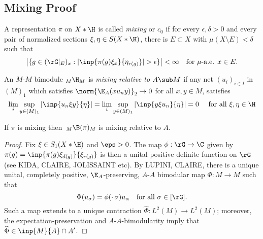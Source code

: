 \documentclass[../main.tex]{subfiles}
\begin{document}
\subsection{Mixing Proof}
\begin{definition}
 A representation $\pi$ on $X \ast \H$ is called {\it mixing} or $c_0$ if 
for every $\epsilon, \delta > 0$ and every pair of normalized sections $\xi, \eta \in S(X \ast \H)$, there is $E \subset X$ with $\mu(X \setminus E) < \delta$ such that 
$$
\left|\{g \in (\rG\vert_E)_x : |\inp{\pi(g)\xi_x}{\eta_{r(g)}}| > \epsilon\}\right| < \infty  \quad \text{for $\mu$-a.e. $x \in E$.}
$$
\end{definition}

\begin{definition}
 An $ M $-$ M $ bimodule $ _M \H_{M} $ is {\it mixing relative to $ A\sub M $} if any net $ (u_{i})_{i\in I} $ in $ (M)_{1} $ which satisfies $ \norm{\E_{A}(xu_{n}y)}_{2}\to 0 $ for all $ x,y\in M $, satisfies
\[
    \lim_{i} \sup_{y\in(M)_{1}} |\inp{u_{n} \xi y}{\eta}| =\lim_{i} \sup_{y\in(M)_{1}} |\inp{y \xi u_{n} }{\eta}| =  0 \quad\text{ for all } \xi, \eta\in \H
\]
\end{definition}


\begin{proposition}
    If $ \pi $ is mixing then $\,_M \B(\pi)_{M} $ is mixing relative to $ A $.
\end{proposition}

\begin{proof}
    Fix $ \xi \in S_{1}(X\ast\H) $ and $ \eps>0 $. The map $ \phi:\rG\to \C $ given by $ \pi(g) = \inp{\pi(g) \xi_{d(g)}}{\xi_{r(g)}} $ is then a unital positive definite function on $ \rG $ (see KIDA, CLAIRE, JOLISSAINT etc).
    By LUPINI, CLAIRE, there is a unique unital, completely positive, $ \E_{A} $-preserving, $ A $-$ A $ bimodular map $ \Phi:M\to M $ such that 
    \[
        \Phi(u_{\sigma}) = \phi(\cdot\, \sigma) u_{\alpha} \quad \text{for all } \sigma\in[\rG].
    \]
    Such a map extends to a unique contraction $ \widehat{\Phi}: L^{2}(M)\to L^2(M) $; moreover, the expectation-preservation and $ A $-$ A $-bimodularity imply that $ \widehat{\Phi}\in \inp{M}{A}\cap A^{\prime} $.
    







\end{proof}
\end{document}
